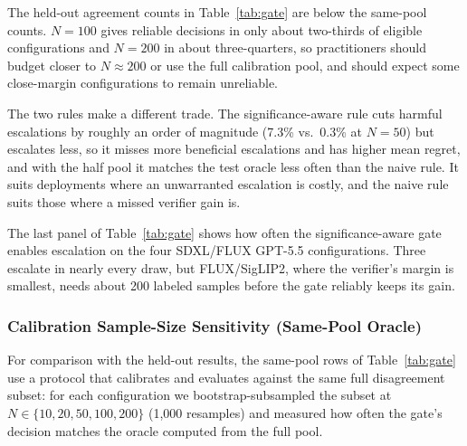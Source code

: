\documentclass{ieeeaccess}
\begin{document}
The held-out agreement counts in Table~\ref{tab:gate} are below the same-pool counts. $N{=}100$ gives reliable decisions in only about two-thirds of eligible configurations and $N{=}200$ in about three-quarters, so practitioners should budget closer to $N{\approx}200$ or use the full calibration pool, and should expect some close-margin configurations to remain unreliable.

The two rules make a different trade. The significance-aware rule cuts harmful escalations by roughly an order of magnitude (7.3\% vs.\ 0.3\% at $N{=}50$) but escalates less, so it misses more beneficial escalations and has higher mean regret, and with the half pool it matches the test oracle less often than the naive rule. It suits deployments where an unwarranted escalation is costly, and the naive rule suits those where a missed verifier gain is.

The last panel of Table~\ref{tab:gate} shows how often the significance-aware gate enables escalation on the four SDXL/FLUX GPT-5.5 configurations. Three escalate in nearly every draw, but FLUX/SigLIP2, where the verifier's margin is smallest, needs about 200 labeled samples before the gate reliably keeps its gain.

\subsubsection{Calibration Sample-Size Sensitivity (Same-Pool Oracle)}

For comparison with the held-out results, the same-pool rows of Table~\ref{tab:gate} use a protocol that calibrates and evaluates against the same full disagreement subset: for each configuration we bootstrap-subsampled the subset at $N \in \{10, 20, 50, 100, 200\}$ (1{,}000 resamples) and measured how often the gate's decision matches the oracle computed from the full pool.
\end{document}
